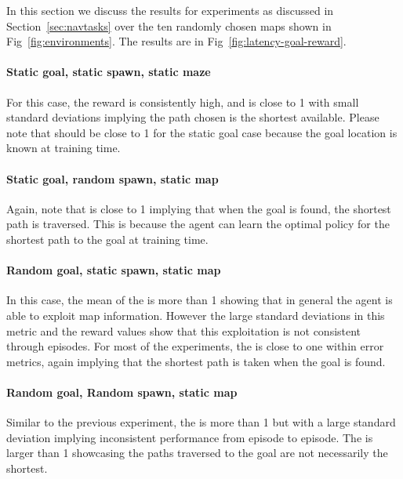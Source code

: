 
In this section we discuss the results for experiments as discussed in Section~\ref{sec:navtasks} over the ten randomly chosen maps shown in Fig~\ref{fig:environments}. The results are in Fig~\ref{fig:latency-goal-reward}.
\paragraph{Static goal, static spawn, static maze}
For this case, the reward is consistently high, and \DistanceInefficiency{} is close to 1 with small standard deviations implying the path chosen is the shortest available.
Please note that \LatencyOneGtOne{} should be close to 1 for the static goal case because the goal location is known at training time.

\paragraph{Static goal, random spawn, static map}
Again, note that \DistanceInefficiency{} is close to 1 implying that when the goal is found, the shortest path is traversed.
This is because the agent can learn the optimal  policy for the shortest path to the goal at training time.

\paragraph{Random goal, static spawn, static map}
In this case, the mean of the \LatencyOneGtOne{} is more than 1 showing that in general the agent is able to exploit map information.
However the large standard deviations in this metric and the reward values show that this exploitation is not consistent through episodes.
For most of the experiments, the \DistanceInefficiency{} is close to one within error metrics, again implying that the shortest path is taken when the goal is found. 

\paragraph{Random goal, Random spawn, static map}
Similar to the previous experiment, the \LatencyOneGtOne{} is more than 1 but with a large standard deviation implying inconsistent performance from episode to episode.
The \DistanceInefficiency{} is larger than 1 showcasing the paths traversed to the goal are not necessarily the shortest.

